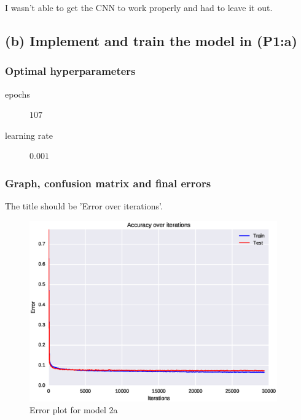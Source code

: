 \documentclass{article}
\begin{document}
I wasn't able to get the CNN to work properly and had to leave it out.

\subsection{(b) Implement and train the model in (P1:a)}

\subsubsection{Optimal hyperparameters}

\begin{description}
\item[epochs] $107$
\item[learning rate] $0.001$
\end{description}

\subsubsection{Graph, confusion matrix and final errors}

The title should be 'Error over iterations'.

\begin{figure}[H]
  \centering
  \includegraphics[width=0.95\textwidth]{error_model_2a.eps}
  \caption{Error plot for model 2a}
  \label{fig:err_2a}
\end{figure}
\end{document}
